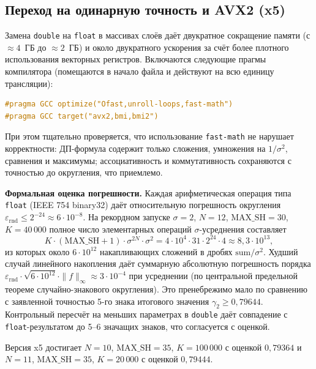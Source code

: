 \subsection{Переход на одинарную точность и AVX2 (x5)}

Замена \texttt{double} на \texttt{float} в массивах слоёв даёт двукратное сокращение памяти (с $\approx 4$~ГБ до $\approx 2$~ГБ) и около двукратного ускорения за счёт более плотного использования векторных регистров. Включаются следующие прагмы компилятора (помещаются в начало файла и действуют на всю единицу трансляции):
\begin{lstlisting}[language=c++,basicstyle=\small\ttfamily,
                   caption={Прагмы оптимизации компилятора (\texttt{src/windowed\_dp.cpp}, репозиторий~\cite{ourgithub})},
                   label={lst:pragmas}]
#pragma GCC optimize("Ofast,unroll-loops,fast-math")
#pragma GCC target("avx2,bmi,bmi2")
\end{lstlisting}

При этом тщательно проверяется, что использование \texttt{fast-math} не нарушает корректности: ДП-формула содержит только сложения, умножения на $1/\sigma^2$, сравнения и максимумы; ассоциативность и коммутативность сохраняются с точностью до округления, что приемлемо.

\textbf{Формальная оценка погрешности.} Каждая арифметическая операция типа \texttt{float} (IEEE 754 binary32) даёт относительную погрешность округления $\varepsilon_{\mathrm{rnd}} \leq 2^{-24} \approx 6 \cdot 10^{-8}$. На рекордном запуске $\sigma = 2$, $N = 12$, $\mathrm{MAX\_SH} = 30$, $K = 40\,000$ полное число элементарных операций $\sigma$-усреднения составляет
\[
    K \cdot (\mathrm{MAX\_SH} + 1) \cdot \sigma^{2N} \cdot \sigma^2 = 4 \cdot 10^4 \cdot 31 \cdot 2^{24} \cdot 4 \approx 8{,}3 \cdot 10^{13},
\]
из которых около $6 \cdot 10^{12}$ накапливающих сложений в дробях $\mathrm{sum}/\sigma^2$. Худший случай линейного накопления даёт суммарную абсолютную погрешность порядка $\varepsilon_{\mathrm{rnd}} \cdot \sqrt{6 \cdot 10^{12}} \cdot \|f\|_\infty \approx 3 \cdot 10^{-4}$ при усреднении (по центральной предельной теореме случайно-знакового округления). Это пренебрежимо мало по сравнению с заявленной точностью 5-го знака итогового значения $\gamma_2 \geq 0{,}79644$. Контрольный пересчёт на меньших параметрах в \texttt{double} даёт совпадение с \texttt{float}-результатом до 5--6 значащих знаков, что согласуется с оценкой.

Версия x5 достигает $N = 10$, $\mathrm{MAX\_SH} = 35$, $K = 100\,000$ с оценкой $0{,}79364$ и $N = 11$, $\mathrm{MAX\_SH} = 35$, $K = 20\,000$ с оценкой $0{,}79444$.

